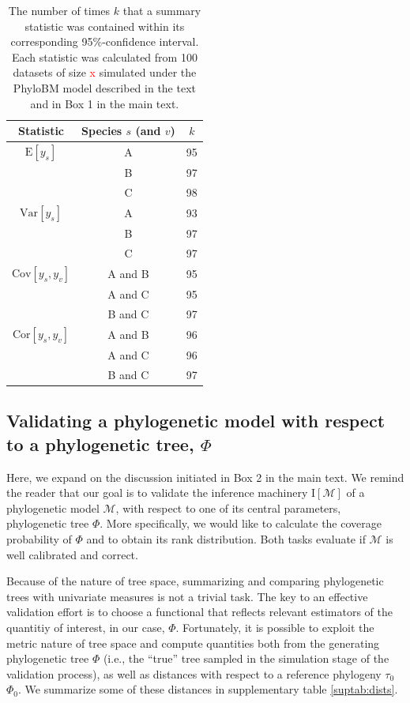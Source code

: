\documentclass[oneside]{article}
\begin{document}
\begin{table}[h]
  \caption{The number of times $k$ that a summary
    statistic was contained within its corresponding
    95\%-confidence interval.
    Each statistic was calculated from 100 datasets of size
    \textcolor{red}{x} simulated
    under the PhyloBM model described in the text and in Box 1
    in the main text.}
  \label{suptab:bmsimcis}
  \centering
  \begin{tabular}{ c|c|c }
    \hline
    Statistic & Species $s$ (and $v$)& $k$\\
    \hline  
    $\text{E}[y_s]$ & A & 95\\
              & B & 97\\
              & C & 98\\
    $\text{Var}[y_s]$ & A & 93\\
              & B & 97\\
              & C & 97\\
    $\text{Cov}[y_s,y_v]$ & A and B & 95\\
              & A and C & 95\\
              & B and C & 97\\
    $\text{Cor}[y_s,y_v]$ & A and B & 96\\
              & A and C & 96\\
              & B and C & 97\\
    \hline
  \end{tabular}
\end{table}

\subsection{Validating a phylogenetic model with respect to a phylogenetic tree, $\Phi$}

Here, we expand on the discussion initiated in Box 2 in the main text.
We remind the reader that our goal is to validate the inference machinery
$\text{I}[\mathcal{M}]$ of a phylogenetic model $\mathcal{M}$, with
respect to one of its central parameters, phylogenetic tree $\Phi$.
More specifically, we would like to calculate the coverage probability of
$\Phi$ and to obtain its rank distribution.
Both tasks evaluate if $\mathcal{M}$ is well calibrated and correct.

Because of the nature of tree space, summarizing and comparing phylogenetic
trees with univariate measures is not a trivial task.
The key to an effective validation effort is to choose a functional
that reflects relevant estimators of the quantitiy of interest, in our case,
$\Phi$.
Fortunately, it is possible to exploit the metric nature of tree space and compute
quantities both from the generating phylogenetic tree $\Phi$ (i.e., the ``true''
tree sampled in the simulation stage of the validation process), as well as distances 
with respect to a reference phylogeny \st{$\tau_0$} $\Phi_0$.
We summarize some of these distances in supplementary table \ref{suptab:dists}.
\end{document}
